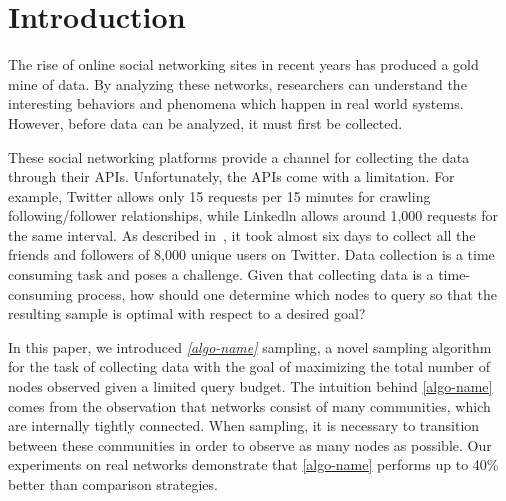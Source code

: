 \section{Introduction}

The rise of online social networking sites in recent years has produced a gold mine of data. By analyzing these networks, researchers can understand the interesting behaviors and phenomena which happen in real world systems. However, before data can be analyzed, it must first be collected.

These social networking platforms provide a channel for collecting the data through their APIs. Unfortunately, the APIs come with a limitation. For example, Twitter allows only 15 requests per 15 minutes for crawling following/follower relationships, while Linkedln allows around 1,000 requests for the same interval. As described in~\cite{wendtdata}, it took almost six days to collect all the friends and followers of 8,000 unique users on Twitter. Data collection is a time consuming task and poses a challenge. Given that collecting data is a time-consuming process, how should one determine which nodes to query so that the resulting sample is optimal with respect to a desired goal?

In this paper, we introduced \textit{\ref{algo-name}} sampling, a novel sampling algorithm for the task of collecting data with the goal of maximizing the total number of nodes observed given a limited query budget.  The intuition behind \ref{algo-name} comes from the observation that networks consist of many communities, which are internally tightly connected.  When sampling, it is necessary to transition between these communities in order to observe as many nodes as possible.  Our experiments on real networks demonstrate that \ref{algo-name} performs up to 40\% better than comparison strategies.  


%
%
